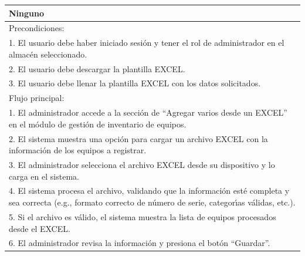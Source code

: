 \documentclass[stu, 12pt, letterpaper, donotrepeattitle, floatsintext, natbib]{apa7}
\begin{document}
\begin{longtable}{@{} p{16.5cm} @{}}
    Ninguno                                                                                                                                                                         \\ \midrule
    Precondiciones:                                                                                                                                                                 \\
    1. El usuario debe haber iniciado sesi\'on y tener el rol de administrador en el almac\'en seleccionado.                                                                        \\
    2. El usuario debe descargar la plantilla EXCEL.                                                                                                                                \\
    3. El usuario debe llenar la plantilla EXCEL con los datos solicitados.                                                                                                         \\ \midrule
    Flujo principal:                                                                                                                                                                \\
    1. El administrador accede a la secci\'on de ``Agregar varios desde un EXCEL'' en el m\'odulo de gesti\'on de inventario de equipos.                                            \\
    2. El sistema muestra una opci\'on para cargar un archivo EXCEL con la informaci\'on de los equipos a registrar.                                                                \\
    3. El administrador selecciona el archivo EXCEL desde su dispositivo y lo carga en el sistema.                                                                                  \\
    4. El sistema procesa el archivo, validando que la informaci\'on est\'e completa y sea correcta (e.g., formato correcto de n\'umero de serie, categor\'{\i}as v\'alidas, etc.). \\
    5. Si el archivo es v\'alido, el sistema muestra la lista de equipos procesados desde el EXCEL.                                                                                 \\
    6. El administrador revisa la informaci\'on y presiona el bot\'on ``Guardar''.                                                                                                  \\

\end{longtable}
\end{document}
